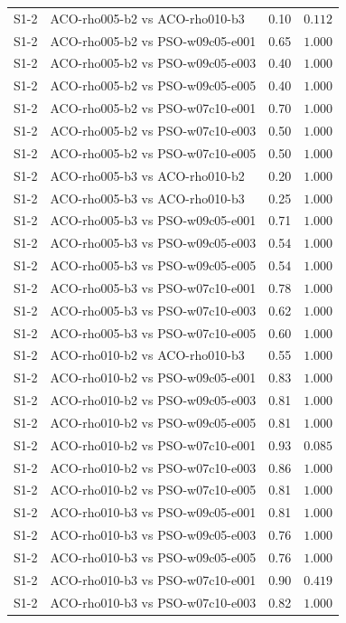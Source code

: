 \begin{tabular}{llrr}
S1-2 & ACO-rho005-b2 vs ACO-rho010-b3 & 0.10 & $0.112$ \\
S1-2 & ACO-rho005-b2 vs PSO-w09c05-e001 & 0.65 & $1.000$ \\
S1-2 & ACO-rho005-b2 vs PSO-w09c05-e003 & 0.40 & $1.000$ \\
S1-2 & ACO-rho005-b2 vs PSO-w09c05-e005 & 0.40 & $1.000$ \\
S1-2 & ACO-rho005-b2 vs PSO-w07c10-e001 & 0.70 & $1.000$ \\
S1-2 & ACO-rho005-b2 vs PSO-w07c10-e003 & 0.50 & $1.000$ \\
S1-2 & ACO-rho005-b2 vs PSO-w07c10-e005 & 0.50 & $1.000$ \\
S1-2 & ACO-rho005-b3 vs ACO-rho010-b2 & 0.20 & $1.000$ \\
S1-2 & ACO-rho005-b3 vs ACO-rho010-b3 & 0.25 & $1.000$ \\
S1-2 & ACO-rho005-b3 vs PSO-w09c05-e001 & 0.71 & $1.000$ \\
S1-2 & ACO-rho005-b3 vs PSO-w09c05-e003 & 0.54 & $1.000$ \\
S1-2 & ACO-rho005-b3 vs PSO-w09c05-e005 & 0.54 & $1.000$ \\
S1-2 & ACO-rho005-b3 vs PSO-w07c10-e001 & 0.78 & $1.000$ \\
S1-2 & ACO-rho005-b3 vs PSO-w07c10-e003 & 0.62 & $1.000$ \\
S1-2 & ACO-rho005-b3 vs PSO-w07c10-e005 & 0.60 & $1.000$ \\
S1-2 & ACO-rho010-b2 vs ACO-rho010-b3 & 0.55 & $1.000$ \\
S1-2 & ACO-rho010-b2 vs PSO-w09c05-e001 & 0.83 & $1.000$ \\
S1-2 & ACO-rho010-b2 vs PSO-w09c05-e003 & 0.81 & $1.000$ \\
S1-2 & ACO-rho010-b2 vs PSO-w09c05-e005 & 0.81 & $1.000$ \\
S1-2 & ACO-rho010-b2 vs PSO-w07c10-e001 & 0.93 & $0.085$ \\
S1-2 & ACO-rho010-b2 vs PSO-w07c10-e003 & 0.86 & $1.000$ \\
S1-2 & ACO-rho010-b2 vs PSO-w07c10-e005 & 0.81 & $1.000$ \\
S1-2 & ACO-rho010-b3 vs PSO-w09c05-e001 & 0.81 & $1.000$ \\
S1-2 & ACO-rho010-b3 vs PSO-w09c05-e003 & 0.76 & $1.000$ \\
S1-2 & ACO-rho010-b3 vs PSO-w09c05-e005 & 0.76 & $1.000$ \\
S1-2 & ACO-rho010-b3 vs PSO-w07c10-e001 & 0.90 & $0.419$ \\
S1-2 & ACO-rho010-b3 vs PSO-w07c10-e003 & 0.82 & $1.000$ \\

\end{tabular}
